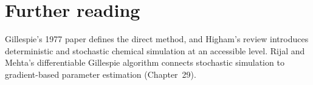 \section*{Further reading}
Gillespie's 1977 paper defines the direct method,\cite{Gillespie1977} and Higham's
review introduces deterministic and stochastic chemical simulation at an
accessible level.\cite{Higham2008} Rijal and Mehta's differentiable Gillespie
algorithm connects stochastic simulation to gradient-based parameter estimation
(Chapter~29).\cite{RijalMehta2025}

